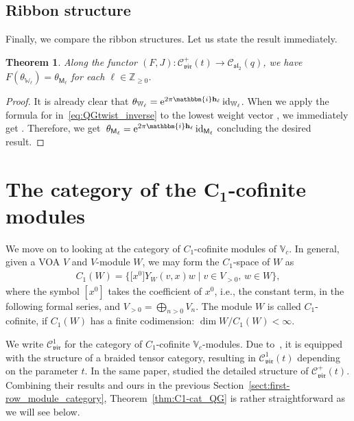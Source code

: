 \documentclass[pdftex]{sigma}
\numberwithin{equation}{section}
\newtheorem{thm}{Theorem}[section]
\newcommand{\id}{\operatorname{id}}
\newcommand{\bZ}{\mathbb{Z}}
\newcommand{\cC}{\mathcal{C}}
\newcommand{\fsl}{\mathfrak{sl}}
\newcommand{\sfM}{\mathsf{M}}
\newcommand{\bbmi}{\mathbbm{i}}
\newcommand{\QGirrep}[1]{\sfM_{#1}}
\newcommand{\QGirvec}[2]{u^{(#1)}_{#2}}
\newcommand{\catQG}{\cC_{\fsl_{2}}}
\newcommand{\catVir}{\cC_{\vir}}
\newcommand{\voaV}{V}
\newcommand{\voagen}{V}
\newcommand{\voamodgen}{W}
\newcommand{\voaY}{Y}
\newcommand{\voavec}{v}
\newcommand{\vmodvec}{w}
\newcommand{\virvoa}{\mathbb{V}}
\newcommand{\virmod}{\mathbb{W}}
\newcommand{\vir}{\mathfrak{vir}}
\newcommand{\frweight}[1]{\mathbf{h}_{#1}}
\begin{document}
\subsection{Ribbon structure}
Finally, we compare the ribbon structures.
Let us state the result immediately.
\begin{thm}
Along the functor $(F,J) \colon \catVir^{+}(t)\to\catQG(q)$, we have
$
 F(\theta_{\virmod_{\ell}})=\theta_{\QGirrep{\ell}}
$
for each $\ell\in\bZ_{\geq 0}$.
\end{thm}
\begin{proof}
It is already clear that $\theta_{\virmod_{\ell}}={\rm e}^{2\pi\bbmi \frweight{\ell}}\id_{\virmod_{\ell}}$.
When we apply the formula for \smash{$\theta_{\QGirrep{\ell}}^{-1}$} in~\eqref{eq:QGtwist_inverse} to the lowest weight vector \smash{$\QGirvec{\ell}{\ell}$}, we immediately get
\smash{$
 \theta_{\QGirrep{\ell}}^{-1} \QGirvec{\ell}{\ell}={\rm e}^{-2\pi\bbmi \frweight{\ell}}\QGirvec{\ell}{\ell}$}.
Therefore, we get~${\theta_{\QGirrep{\ell}}={\rm e}^{2\pi\bbmi \frweight{\ell}}\id_{\QGirrep{\ell}}}$ concluding the desired result.
\end{proof}


\section[The category of the C\_1-cofinite modules]{The category of the $\boldsymbol{ C_{1}}$-cofinite modules}
\label{sect:C1-cofinite_module_category}
We move on to looking at the category of $C_{1}$-cofinite modules of $\virvoa_{c}$.
In general, given a VOA $\voagen$ and $\voagen$-module $\voamodgen$,
we may form the $C_{1}$-space of $\voamodgen$ as
\begin{gather*}
	C_{1}(\voamodgen) = \bigl\{\bigl[x^{0}\bigr]\voaY_{\voamodgen}(\voavec,x)\vmodvec\mid \voavec\in\voagen_{>0}, \, \vmodvec \in \voamodgen\bigr\},
\end{gather*}
where the symbol $[x^{0}]$ takes the coefficient of $x^{0}$, i.e., the constant term, in the following formal series, and $\voaV_{>0} = \bigoplus_{n>0} \voaV_{n}$.
The module $\voamodgen$ is called $C_{1}$-cofinite, if $C_{1}(W)$ has a finite codimension: $\dim \voamodgen/C_{1}(\voamodgen)<\infty$.

We write $\catVir^{1}$ for the category of $C_{1}$-cofinite $\virvoa_{c}$-modules.
Due to~\cite{CJORY-tensor_categories_arising_from_Virasoro_algebra}, it is equipped with the structure of a braided tensor category,
resulting in $\catVir^{1}(t)$ depending on the parameter $t$.
In the same paper, \cite{CJORY-tensor_categories_arising_from_Virasoro_algebra} studied the detailed structure of $\catVir^{+}(t)$.
Combining their results and ours in the previous Section~\ref{sect:first-row_module_category},
Theorem~\ref{thm:C1-cat_QG} is rather straightforward as we will see below.
\end{document}
